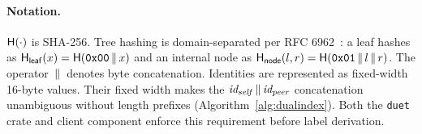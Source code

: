 \paragraph{Notation.} $\mathsf{H}(\cdot)$ is SHA-256. Tree hashing is domain-separated per RFC 6962~\cite[Section~2.1]{rfc6962}: a
leaf hashes as $\mathsf{H}_{\mathsf{leaf}}(x)=\mathsf{H}(\texttt{0x00}\,\|\, x)$ and an internal node as
$\mathsf{H}_{\mathsf{node}}(l,r)=\mathsf{H}(\texttt{0x01}\,\|\, l\,\|\, r)$. The operator $\,\|\,$ denotes byte
concatenation. Identities are represented as fixed-width 16-byte values. Their fixed width makes the
$\mathit{id_{self}}\,\|\,\mathit{id_{peer}}$ concatenation unambiguous without length prefixes
(Algorithm~\ref{alg:dualindex}). Both the \texttt{duet} crate and client component enforce this
requirement before label derivation.

